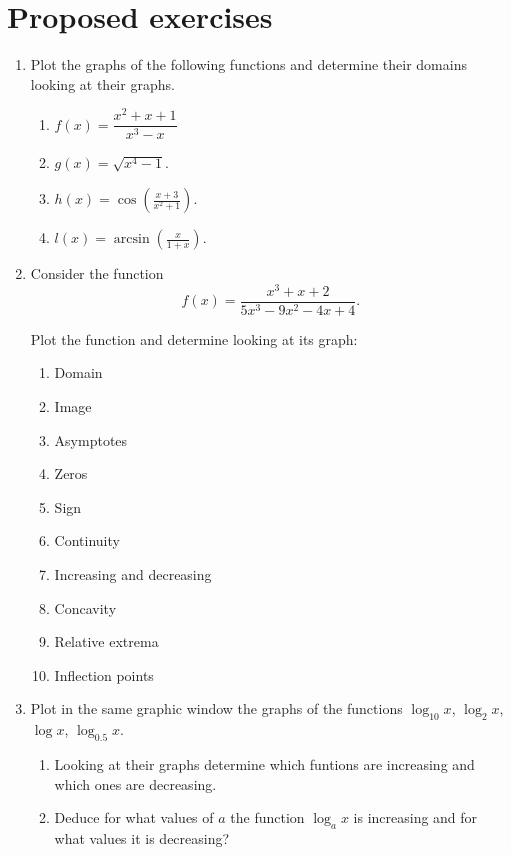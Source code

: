 \section{Proposed exercises}
\begin{enumerate}[leftmargin=*]
\item Plot the graphs of the following functions and determine their domains looking at their graphs.  

\begin{enumerate}
\item $f(x)=\dfrac{x^2+x+1}{x^3-x}$
\item $g(x)=\sqrt{x^4-1}$.
\item $h(x)=\cos\left(\frac{x+3}{x^2+1}\right)$.
\item $l(x)=\arcsin\left(\frac{x}{1+x}\right)$.
\end{enumerate}

\item Consider the function
\[
f(x)=\frac{x^3+x+2}{5x^3-9x^2-4x+4}.
\]

Plot the function and determine looking at its graph:
\begin{enumerate}
\item Domain
\item Image
\item Asymptotes
\item Zeros
\item Sign
\item Continuity
\item Increasing and decreasing
\item Concavity
\item Relative extrema
\item Inflection points
\end{enumerate}

\item Plot in the same graphic window the graphs of the functions $\log_{10}x$, $\log_{2}x$, $\log x$, $\log_{0.5}x$.
\begin{enumerate}
\item Looking at their graphs determine which funtions are increasing and which ones are decreasing.
\item Deduce for what values of $a$ the function $\log_ax$ is increasing and for what values it is decreasing?
\end{enumerate}


\end{enumerate}

